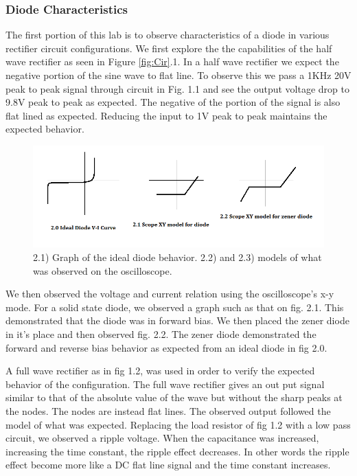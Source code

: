 \documentclass[11pt,letterpaper,onecolumn]{article}
\begin{document}
\subsubsection{Diode Characteristics}

The first portion of this lab is to observe characteristics of a diode in various rectifier circuit configurations. We first explore the the capabilities of the half wave rectifier as seen in Figure \ref{fig:Cir}.1. In a half wave rectifier we expect the negative portion of the sine wave to flat line. To observe this we pass a 1KHz 20V peak to peak signal through circuit in Fig. 1.1 and see the output voltage drop to 9.8V peak to peak as expected. The negative of the portion of the signal is also flat lined as expected. Reducing the input to 1V peak to peak maintains the expected behavior.

\begin{figure}[H]
    \hspace*{-2.5cm}
    \includegraphics[scale = .8]{graphs.png}
    \caption{2.1) Graph of the ideal diode behavior.
    2.2) and 2.3) models of what was observed on the oscilloscope.}
    \label{fig:graph}
\end{figure}

We then observed the voltage and current relation using the oscilloscope's x-y mode. For a solid state diode, we observed a graph such as that on fig. 2.1. This demonstrated that the diode was in forward bias. We then placed the zener diode in it's place and then observed fig. 2.2. The zener diode demonstrated the forward and reverse bias behavior as expected from an ideal diode in fig 2.0. 

A full wave rectifier as in fig 1.2, was used in order to verify the expected behavior of the configuration. The full wave rectifier gives an out put signal similar to that of the absolute value of the wave but without the sharp peaks at the nodes. The nodes are instead flat lines. The observed output followed the model of what was expected. Replacing the load resistor of fig 1.2 with a low pass circuit, we observed a ripple voltage. When the capacitance was increased, increasing the time constant, the ripple effect decreases. In other words the ripple effect become more like a DC flat line signal and the time constant increases. 
\end{document}
